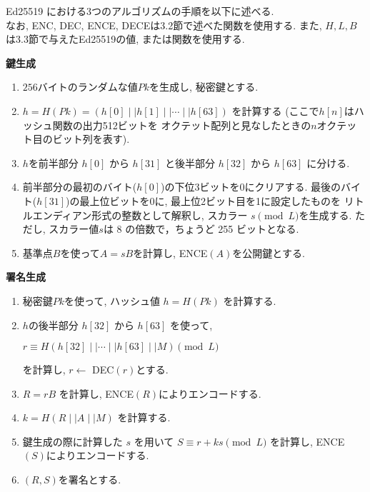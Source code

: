Ed25519 における3つのアルゴリズムの手順を以下に述べる.\\
\indent なお, ENC, DEC, ENCE, DECEは3.2節で述べた関数を使用する.
また, $H, L, B$は3.3節で与えたEd25519の値, または関数を使用する.\\[1em]
\let\ltxlist\list
\begin{breakitembox}[l]{\textbf{鍵生成}}
  　
  \begin{enumerate}[parsep=7pt]
    \item $256$バイトのランダムな値$Pk$を生成し, 秘密鍵とする.
    \item $h=H(Pk)=(h[0]\mid\mid h[1]\mid\mid \cdots\mid\mid h[63])$
    を計算する (ここで$h[n]$はハッシュ関数の出力512ビットを
    オクテット配列と見なしたときの$n$オクテット目のビット列を表す). 
    \item $h$を前半部分 $h[0]$ から $h[31]$ と後半部分 $h[32]$ から $h[63]$ に分ける.
    \item 前半部分の最初のバイト($h[0]$)の下位3ビットを0にクリアする.
    最後のバイト($h[31]$)の最上位ビットを0に, 最上位2ビット目を1に設定したものを
    リトルエンディアン形式の整数として解釈し, スカラー $s \pmod L$を生成する. 
    ただし, スカラー値$s$は 8 の倍数で，ちょうど 255 ビットとなる.
    \item 基準点$B$を使って$A = sB$を計算し, ENCE$(A)$を公開鍵とする. 
  \end{enumerate}
\end{breakitembox}
\vspace{2em}
\let\ltxlist\list
\begin{breakitembox}[l]{\textbf{署名生成}}
  　
  \begin{enumerate}[parsep=7pt]
    \item 秘密鍵$Pk$を使って, ハッシュ値 $h=H(Pk)$ を計算する.
    \item $h$の後半部分 $h[32]$ から $h[63]$ を使って, 
    \begin{center}
      $r \equiv H(h[32]\mid\mid \cdots \mid\mid h[63] \mid\mid M) \pmod L$
    \end{center}
    を計算し, $r\leftarrow$ DEC$(r)$とする.
    \item $R=rB$ を計算し, ENCE$(R)$によりエンコードする.
    \item $k=H(R \mid\mid A \mid\mid M)$ を計算する.
    \item 鍵生成の際に計算した $s$ を用いて $S\equiv r+ks \pmod L$ を計算し, ENCE$(S)$によりエンコードする.
    \item $(R,S)$を署名とする.
  \end{enumerate}
\end{breakitembox}
